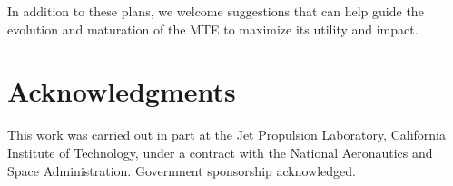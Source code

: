 \documentclass[letterpaper]{article}
\begin{document}

In addition to these plans, we welcome suggestions that can help guide
the evolution and maturation of the MTE to maximize its utility and
impact.

\section*{Acknowledgments}
This work was carried out in part at the Jet Propulsion Laboratory,
California Institute of Technology, under a contract with the National
Aeronautics and Space Administration. Government sponsorship
acknowledged.



\end{document}
